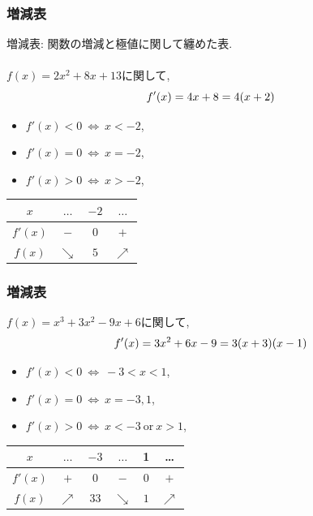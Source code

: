 \documentclass[dvipdfmx,cjk,10.2pt]{beamer}
\theoremstyle{definition}
\begin{document}
\begin{frame}
\frametitle{増減表}

増減表: 関数の増減と極値に関して纏めた表.\\
\ \\

$f(x)=2x^2+8x+13$に関して, 
$$
f'(x)=4x+8=4(x+2) \vspace{-4.5mm}
$$
\begin{itemize}
\item $f'(x)<0 \ \Leftrightarrow \ x<-2$, 
\item $f'(x)=0 \ \Leftrightarrow \ x=-2$, 
\item $f'(x)>0 \ \Leftrightarrow \ x>-2$, 
\end{itemize}

\begin{table}[htb]
\begin{center}
\begin{tabular}{c|c|c|c}
$x$ & $\dots$ & $-2$ & $\dots$ \\ \hline 
$f'(x)$   & $-$ & 0  & $+$   \\ \hline 
$f(x)$   & $\searrow$ & $5$ &  $\nearrow$  
  \end{tabular}
  \end{center}
\end{table}

\end{frame}







\begin{frame}
\frametitle{増減表}

$f(x)=x^3+3x^2-9x+6$に関して, 
$$
f'(x)=3x^2+6x-9=3(x+3)(x-1) \vspace{-4.5mm}
$$
\begin{itemize}
\item $f'(x)<0 \ \Leftrightarrow \ -3<x<1$, 
\item $f'(x)=0 \ \Leftrightarrow \ x=-3,1$, 
\item $f'(x)>0 \ \Leftrightarrow \ x<-3 \ \text{or} \ x>1$, 
\end{itemize}

\begin{table}[htb]
\begin{center}
\begin{tabular}{c|c|c|c|c|c}
$x$ & $\dots$ & $-3$ & $\dots$ & 1 & \dots \\ \hline 
$f'(x)$   & $+$ & $0$  & $-$  & $0$ & $+$   \\ \hline 
$f(x)$   & $\nearrow$  & $33$ & $\searrow$  & $1$ &  $\nearrow$  
  \end{tabular}
  \end{center}
\end{table}

\end{frame}
\end{document}
